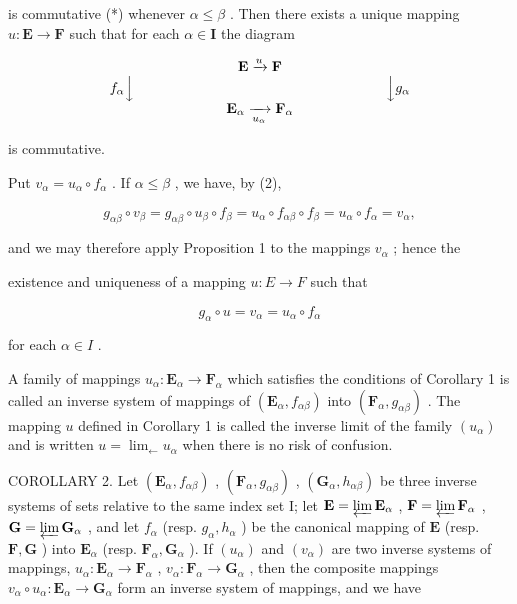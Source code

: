 is commutative (*) whenever \(\alpha \leqslant \beta\) . Then there exists a unique mapping \(u: \mathbf{E} \to \mathbf{F}\) such that for each \(\alpha \in \mathbf{I}\) the diagram

\[
\begin{array}{c} \mathbf {E} \xrightarrow {u} \mathbf {F} \\ f _ {\alpha} \Big \downarrow \qquad \qquad \qquad \qquad \qquad \qquad \qquad \qquad \qquad \Big \downarrow g _ {\alpha} \\ \mathbf {E} _ {\alpha} \xrightarrow [ u _ {\alpha} ]{} \mathbf {F} _ {\alpha} \end{array}
\]

is commutative.

Put \(v_{\alpha} = u_{\alpha} \circ f_{\alpha}\) . If \(\alpha \leqslant \beta\) , we have, by (2),

\[
g _ {\alpha \beta} \circ v _ {\beta} = g _ {\alpha \beta} \circ u _ {\beta} \circ f _ {\beta} = u _ {\alpha} \circ f _ {\alpha \beta} \circ f _ {\beta} = u _ {\alpha} \circ f _ {\alpha} = v _ {\alpha},
\]

and we may therefore apply Proposition 1 to the mappings \(v_{\alpha}\) ; hence the

existence and uniqueness of a mapping \(u: E \rightarrow F\) such that

\[
g _ {\alpha} \circ u = v _ {\alpha} = u _ {\alpha} \circ f _ {\alpha}
\]

for each \(\alpha \in I\) .

A family of mappings \(u_{\alpha}: \mathbf{E}_{\alpha} \to \mathbf{F}_{\alpha}\) which satisfies the conditions of Corollary 1 is called an inverse system of mappings of \((\mathbf{E}_{\alpha}, f_{\alpha\beta})\) into \((\mathbf{F}_{\alpha}, g_{\alpha\beta})\) . The mapping \(u\) defined in Corollary 1 is called the inverse limit of the family \((u_{\alpha})\) and is written \(u = \lim_{\leftarrow} u_{\alpha}\) when there is no risk of confusion.

COROLLARY 2. Let \((\mathbf{E}_{\alpha}, f_{\alpha \beta})\) , \((\mathbf{F}_{\alpha}, g_{\alpha \beta})\) , \((\mathbf{G}_{\alpha}, h_{\alpha \beta})\) be three inverse systems of sets relative to the same index set I; let \(\mathbf{E} = \varprojlim \mathbf{E}_{\alpha}\) , \(\mathbf{F} = \varprojlim \mathbf{F}_{\alpha}\) , \(\mathbf{G} = \varprojlim \mathbf{G}_{\alpha}\) , and let \(f_{\alpha}\) (resp. \(g_{\alpha}, h_{\alpha}\) ) be the canonical mapping of \(\mathbf{E}\) (resp. \(\mathbf{F}, \mathbf{G}\) ) into \(\mathbf{E}_{\alpha}\) (resp. \(\mathbf{F}_{\alpha}, \mathbf{G}_{\alpha}\) ). If \((u_{\alpha})\) and \((v_{\alpha})\) are two inverse systems of mappings, \(u_{\alpha}: \mathbf{E}_{\alpha} \to \mathbf{F}_{\alpha}\) , \(v_{\alpha}: \mathbf{F}_{\alpha} \to \mathbf{G}_{\alpha}\) , then the composite mappings \(v_{\alpha} \circ u_{\alpha}: \mathbf{E}_{\alpha} \to \mathbf{G}_{\alpha}\) form an inverse system of mappings, and we have

